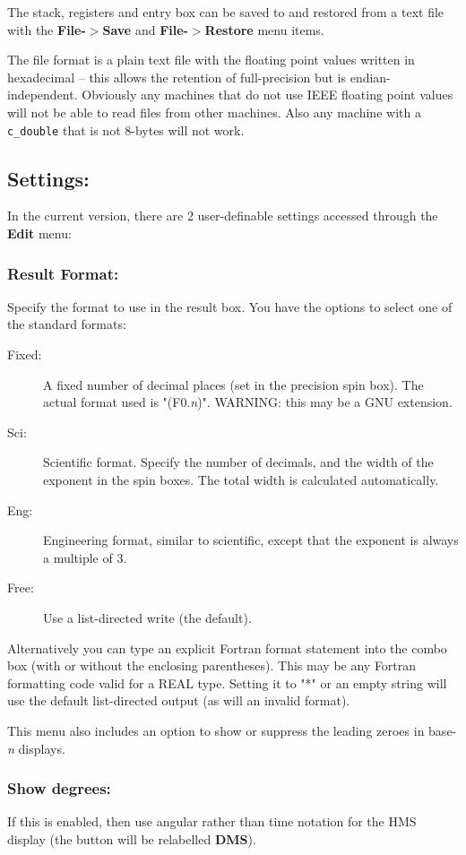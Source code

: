 \documentclass{article}
\begin{document}
  The stack, registers and entry box can be saved to and restored from
  a text file with the \textbf{File-$>$Save} and
  \textbf{File-$>$Restore} menu items.

  The file format is a plain text file with the floating point values
  written in hexadecimal -- this allows the retention of full-precision
  but is endian-independent. Obviously any machines that do not use
  IEEE floating point values will not be able to read files from other
  machines. Also any machine with a \texttt{c\_double} that is not
  8-bytes will not work.

  \subsection{Settings:}

  In the current version, there are 2 user-definable settings accessed
  through the \textbf{Edit} menu:

  \subsubsection{Result Format:}
  Specify the format to use in the result box. You have the options to
  select one of the standard formats:
  \begin{description}
  \item [Fixed:] A fixed number of decimal places (set in the precision
    spin box). The actual format used is "(F0.\emph{n})". WARNING: this
    may be a GNU extension.
  \item[Sci:] Scientific format. Specify the number of decimals, and
    the width of the exponent in the spin boxes. The total width is
    calculated automatically.
  \item[Eng:] Engineering format, similar to scientific, except that
    the exponent is always a multiple of 3.
  \item[Free:] Use a list-directed write (the default).
  \end{description}
  Alternatively you can type an explicit Fortran format statement into
  the combo box (with or without the enclosing parentheses). This may
  be any Fortran formatting code valid for a REAL type. Setting it to
  "*" or an empty string will use the default list-directed output (as
  will an invalid format).

This menu also includes an option to show or suppress the leading
zeroes in base-\emph{n} displays.

  \subsubsection{Show degrees:}
  If this is enabled, then use angular rather than time notation for the
  HMS display (the button will be relabelled \textbf{DMS}).
\end{document}
